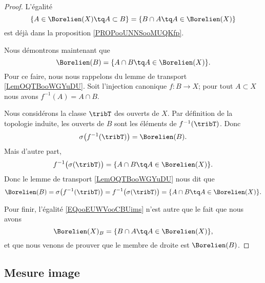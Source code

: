 \begin{proof}
    L'égalité
    \begin{equation}
        \{ A\in \Borelien(X)\tq A\subset B \}=\{ B\cap A\tq A\in \Borelien(X) \}
    \end{equation}
    est déjà dans la proposition \ref{PROPooUNNSooMUQKfp}.

    Nous démontrons maintenant que
    \begin{equation}
        \Borelien(B)=\{ A\cap B\tq A\in\Borelien(X) \}.
    \end{equation}
    Pour ce faire, nous nous rappelons du lemme de transport \ref{LemOQTBooWGYuDU}. Soit l'injection canonique \( f\colon B\to X\); pour tout \( A\subset X\) nous avons \( f^{-1}(A)=A\cap B\).

    Nous considérons la classe \( \tribT\) des ouverts de \( X\). Par définition de la topologie induite, les ouverts de \( B\) sont les éléments de \( f^{-1}(\tribT)\). Donc
    \begin{equation}
        \sigma\big( f^{-1}(\tribT) \big)=\Borelien(B).
    \end{equation}
    Mais d'autre part,
    \begin{equation}
        f^{-1}\big( \sigma(\tribT) \big)=\{ A\cap B\tq A\in \Borelien(X) \}.
    \end{equation}
    Donc le lemme de transport \ref{LemOQTBooWGYuDU} nous dit que
    \begin{equation}
        \Borelien(B)=\sigma\big( f^{-1}(\tribT) \big)= f^{-1}\big( \sigma(\tribT) \big)=\{ A\cap B\tq A\in \Borelien(X) \}.
    \end{equation}

    Pour finir, l'égalité \eqref{EQooEUWVooCBUims} n'est autre que le fait que nous avons
    \begin{equation}
        \Borelien(X)_B=\{ B\cap A\tq A\in \Borelien(X) \},
    \end{equation}
    et que nous venons de prouver que le membre de droite est \( \Borelien(B)\).
\end{proof}

\subsection{Mesure image}

